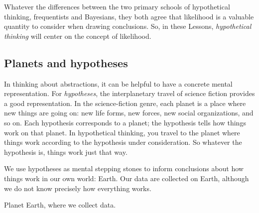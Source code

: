 \documentclass[
  letterpaper,
  DIV=11,
  numbers=noendperiod,
  oneside]{scrartcl}
\begin{document}
{} Whatever the differences between
the two primary schools of hypothetical thinking, frequentists and
Bayesians, they both agree that likelihood is a valuable quantity to
consider when drawing conclusions. So, in these Lessons,
\emph{hypothetical thinking} will center on the concept of likelihood.

\subsection{Planets and hypotheses}\label{planets-and-hypotheses}

In thinking about abstractions, it can be helpful to have a concrete
mental representation. For \emph{hypotheses}, the interplanetary travel
of science fiction provides a good representation. In the
science-fiction genre, each planet is a place where new things are going
on: new life forms, new forces, new social organizations, and so on.
Each hypothesis corresponds to a planet; the hypothesis tells how things
work on that planet. In hypothetical thinking, you travel to the planet
where things work according to the hypothesis under consideration. So
whatever the hypothesis is, things work just that way.

We use hypotheses as mental stepping stones to inform conclusions about
how things work in our own world: Earth. Our data are collected on
Earth, although we do not know precisely how everything works.
{}

\begin{marginfigure}


\caption{\label{fig-planet-earth}Planet Earth, where we collect data.}

\end{marginfigure}%
\end{document}
